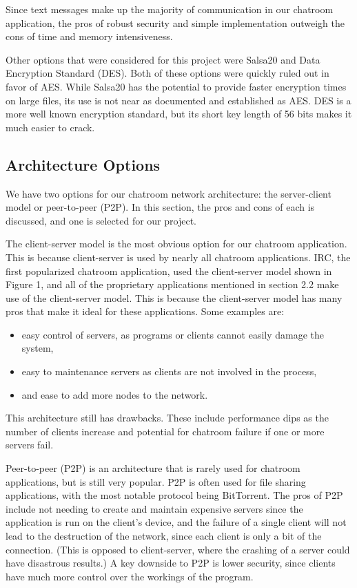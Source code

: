 \documentclass{article}
\begin{document}
Since text messages make up the majority of communication in our chatroom application, the pros of robust security and simple implementation outweigh the cons of time and memory intensiveness. 

Other options that were considered for this project were Salsa20 and Data Encryption Standard (DES). Both of these options were quickly ruled out in favor of AES. While Salsa20 has the potential to provide faster encryption times on large files, its use is not near as documented and established as AES. DES is a more well known encryption standard, but its short key length of 56 bits makes it much easier to crack. 

\subsection{Architecture Options}

We have two options for our chatroom network architecture: the server-client model or peer-to-peer (P2P). In this section, the pros and cons of each is discussed, and one is selected for our project. 

The client-server model is the most obvious option for our chatroom application. This is because client-server is used by nearly all chatroom applications. IRC, the first popularized chatroom application, used the client-server model shown in Figure 1, and all of the proprietary applications mentioned in section 2.2 make use of the client-server model. This is because the client-server model has many pros that make it ideal for these applications. Some examples are: 

\begin{itemize}
  \item easy control of servers, as programs or clients cannot easily damage the system,
  \item easy to maintenance servers as clients are not involved in the process,
  \item and ease to add more nodes to the network.
\end{itemize}

This architecture still has drawbacks. These include performance dips as the number of clients increase and potential for chatroom failure if one or more servers fail. 

Peer-to-peer (P2P) is an architecture that is rarely used for chatroom applications, but is still very popular. P2P is often used for file sharing applications, with the most notable protocol being BitTorrent. The pros of P2P include not needing to create and maintain expensive servers since the application is run on the client's device, and the failure of a single client will not lead to the destruction of the network, since each client is only a bit of the connection. (This is opposed to client-server, where the crashing of a server could have disastrous results.) A key downside to P2P is lower security, since clients have much more control over the workings of the program.
\end{document}
